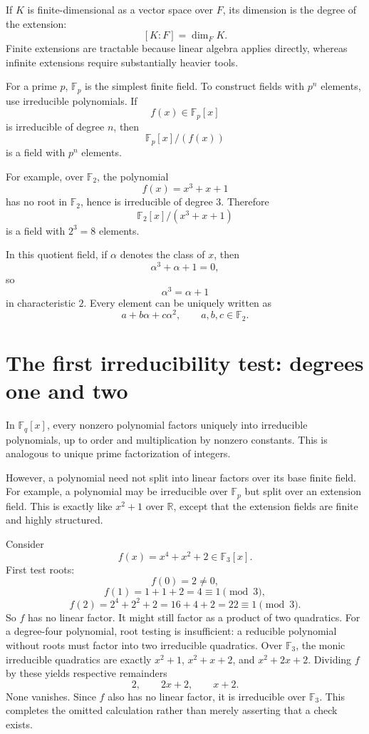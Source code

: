If \(K\) is finite-dimensional as a vector space over \(F\), its dimension is the degree of the extension:
\[
  [K:F]=\dim_F K.
\]
Finite extensions are tractable because linear algebra applies directly, whereas infinite extensions require substantially heavier tools.

For a prime \(p\), \(\mathbb F_p\) is the simplest finite field.  To construct fields with \(p^n\) elements, use irreducible polynomials.  If
\[
  f(x)\in\mathbb F_p[x]
\]
is irreducible of degree \(n\), then
\[
  \mathbb F_p[x]/(f(x))
\]
is a field with \(p^n\) elements.

For example, over \(\mathbb F_2\), the polynomial
\[
  f(x)=x^3+x+1
\]
has no root in \(\mathbb F_2\), hence is irreducible of degree \(3\).  Therefore
\[
  \mathbb F_2[x]/(x^3+x+1)
\]
is a field with \(2^3=8\) elements.

In this quotient field, if \(\alpha\) denotes the class of \(x\), then
\[
  \alpha^3+\alpha+1=0,
\]
so
\[
  \alpha^3=\alpha+1
\]
in characteristic \(2\).  Every element can be uniquely written as
\[
  a+b\alpha+c\alpha^2,\qquad a,b,c\in\mathbb F_2.
\]

\section{The first irreducibility test: degrees one and two}

In \(\mathbb F_q[x]\), every nonzero polynomial factors uniquely into irreducible polynomials, up to order and multiplication by nonzero constants.  This is analogous to unique prime factorization of integers.

However, a polynomial need not split into linear factors over its base finite field.  For example, a polynomial may be irreducible over \(\mathbb F_p\) but split over an extension field.  This is exactly like \(x^2+1\) over \(\mathbb R\), except that the extension fields are finite and highly structured.

Consider
\[
  f(x)=x^4+x^2+2\in\mathbb F_3[x].
\]
First test roots:
\[
  f(0)=2\neq0,
\]
\[
  f(1)=1+1+2=4\equiv1\pmod3,
\]
\[
  f(2)=2^4+2^2+2=16+4+2=22\equiv1\pmod3.
\]
So \(f\) has no linear factor.  It might still factor as a product of two quadratics.  For a degree-four polynomial, root testing is insufficient: a reducible polynomial without roots must factor into two irreducible quadratics. Over \(\mathbb F_3\), the monic irreducible quadratics are exactly \(x^2+1\), \(x^2+x+2\), and \(x^2+2x+2\). Dividing \(f\) by these yields respective remainders
\[
 2,\qquad 2x+2,\qquad x+2.
\]
None vanishes. Since \(f\) also has no linear factor, it is irreducible over \(\mathbb F_3\). This completes the omitted calculation rather than merely asserting that a check exists.

